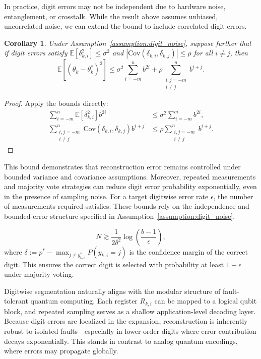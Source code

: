 \documentclass[aps,twocolumn,superscriptaddress,nofootinbib]{revtex4}
\newtheorem{corollary}{Corollary}
\begin{document}
In practice, digit errors may not be independent due to hardware noise, entanglement, or crosstalk. While the result above assumes unbiased, uncorrelated noise, we can extend the bound to include correlated digit errors.

\begin{corollary}
Under Assumption~\ref{assumption:digit_noise}, suppose further that if digit errors satisfy \( \mathbb{E}[\delta_{k,i}^2] \leq \sigma^2 \) and \( |\text{Cov}(\delta_{k,i}, \delta_{k,j})| \leq \rho \) for all \( i \neq j \), then
\begin{equation}
    \mathbb{E}\left[ (\theta_k - \theta_k^*)^2 \right] 
    \leq \sigma^2 \sum_{i=-m}^{n} b^{2i} + \rho \sum_{\substack{i,j=-m \\ i \neq j}}^{n} b^{i+j}.
\end{equation}
\end{corollary}

\begin{proof}
Apply the bounds directly:
\begin{align}
\sum_{i=-m}^{n} \mathbb{E}[\delta_{k,i}^2] b^{2i} &\leq \sigma^2 \sum_{i=-m}^{n} b^{2i}, \label{eq:variance_bound} \\
\sum_{\substack{i,j=-m \\ i \neq j}}^{n} \text{Cov}(\delta_{k,i}, \delta_{k,j}) b^{i+j} 
&\leq \rho \sum_{\substack{i,j=-m \\ i \neq j}}^{n} b^{i+j}. \label{eq:covariance_bound}
\end{align}
\end{proof}

This bound demonstrates that reconstruction error remains controlled under bounded variance and covariance assumptions. Moreover, repeated measurements and majority vote strategies can reduce digit error probability exponentially, even in the presence of sampling noise. For a target digitwise error rate $\epsilon$, the number of measurements required satisfies. These bounds rely on the independence and bounded-error structure specified in Assumption~\ref{assumption:digit_noise}.

\[
N \gtrsim \frac{1}{2\delta^2} \log\left( \frac{b - 1}{\epsilon} \right),
\]
where $\delta := p^* - \max_{j \neq y^*_{k,i}} P(y_{k,i} = j)$ is the confidence margin of the correct digit. This ensures the correct digit is selected with probability at least $1 - \epsilon$ under majority voting.

Digitwise segmentation naturally aligns with the modular structure of fault-tolerant quantum computing. Each register $R_{k,i}$ can be mapped to a logical qubit block, and repeated sampling serves as a shallow application-level decoding layer. Because digit errors are localized in the expansion, reconstruction is inherently robust to isolated faults—especially in lower-order digits where error contribution decays exponentially. This stands in contrast to analog quantum encodings, where errors may propagate globally.
\end{document}
